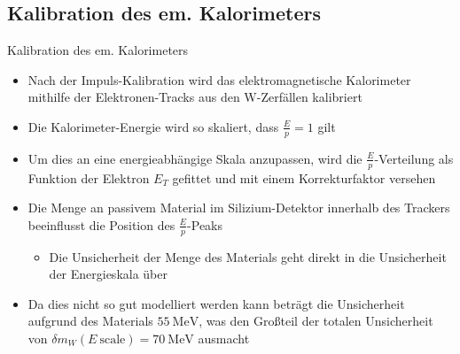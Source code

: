 \documentclass[aspectratio=1610, 9pt]{beamer}
\begin{document}
\subsection{Kalibration des em. Kalorimeters}

\begin{frame}{Kalibration des em. Kalorimeters}
  \begin{itemize}
    \item Nach der Impuls-Kalibration wird das elektromagnetische Kalorimeter mithilfe der Elektronen-Tracks aus den W-Zerfällen kalibriert
    \item Die Kalorimeter-Energie wird so skaliert, dass $\frac{E}{p} = \num{1}$ gilt
    \item Um dies an eine energieabhängige Skala anzupassen, wird die $\frac{E}{p}$-Verteilung als Funktion der Elektron $E_T$ gefittet und mit einem Korrekturfaktor versehen
  \end{itemize}


\end{frame}

\begin{frame}
  \begin{itemize}
    \item Die Menge an passivem Material im Silizium-Detektor innerhalb des Trackers beeinflusst die Position des $\frac{E}{p}$-Peaks
    \begin{itemize}
      \item[\rightarrow] Die Unsicherheit der Menge des Materials geht direkt in die Unsicherheit der Energieskala über
    \end{itemize}
    \item Da dies nicht so gut modelliert werden kann beträgt die Unsicherheit aufgrund des Materials $\SI{55}{\MeV}$, was den Großteil der totalen Unsicherheit von $\delta m_W (E \: \text{scale}) = \SI{70}{\MeV}$ ausmacht
  \end{itemize}
\end{frame}
\end{document}
